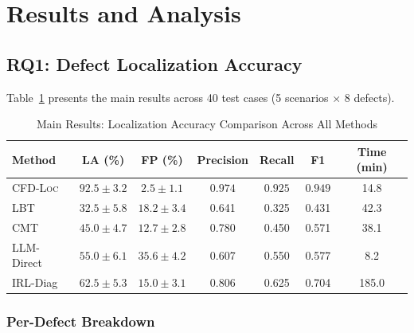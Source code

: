 \documentclass[journal]{IEEEtran}
\theoremstyle{plain}
\theoremstyle{definition}
\theoremstyle{remark}
\newcommand{\methodname}{\textsc{CFD-Loc}}
\begin{document}
\section{Results and Analysis}
\label{sec:results}

\subsection{RQ1: Defect Localization Accuracy}

Table~\ref{tab:main} presents the main results across 40 test cases (5 scenarios $\times$ 8 defects).

\begin{table}[t]
\centering
\caption{Main Results: Localization Accuracy Comparison Across All Methods}
\label{tab:main}
\small
\begin{tabular}{lcccccc}
\toprule
\textbf{Method} & \textbf{LA (\%)} & \textbf{FP (\%)} & \textbf{Precision} & \textbf{Recall} & \textbf{F1} & \textbf{Time (min)} \\\midrule
\rowcolor{accentgreen!12}
\methodname & $\mathbf{92.5 \pm 3.2}$ & $\mathbf{2.5 \pm 1.1}$ & $\mathbf{0.974}$ & $\mathbf{0.925}$ & $\mathbf{0.949}$ & 14.8 \\
LBT & $32.5 \pm 5.8$ & $18.2 \pm 3.4$ & 0.641 & 0.325 & 0.431 & 42.3 \\
CMT & $45.0 \pm 4.7$ & $12.7 \pm 2.8$ & 0.780 & 0.450 & 0.571 & 38.1 \\
LLM-Direct & $55.0 \pm 6.1$ & $35.6 \pm 4.2$ & 0.607 & 0.550 & 0.577 & 8.2 \\
IRL-Diag & $62.5 \pm 5.3$ & $15.0 \pm 3.1$ & 0.806 & 0.625 & 0.704 & 185.0 \\
\bottomrule
\end{tabular}
\end{table}

\subsubsection{Per-Defect Breakdown}
\end{document}
